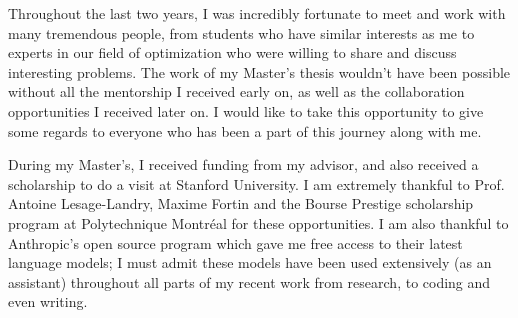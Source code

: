 %

%
Throughout the last two years, I was incredibly fortunate to meet
and work with many tremendous people, from students who have similar interests
as me to experts in our field of optimization who were willing to share and
discuss interesting problems.
The work of my Master's thesis wouldn't have been possible without all the
mentorship I received early on, as well as the collaboration opportunities
I received later on.
I would like to take this opportunity to give some regards to everyone who
has been a part of this journey along with me.

During my Master's, I received funding from my advisor,
and also received a scholarship to do a visit at Stanford University.
I am extremely thankful to Prof. Antoine Lesage-Landry, Maxime Fortin and the Bourse Prestige
scholarship program at Polytechnique Montréal for these opportunities.
I am also thankful to Anthropic's open source program which gave me free
access to their latest language models; I must admit these models have been
used extensively (as an assistant) throughout all parts of my recent work
from research, to coding and even writing.

